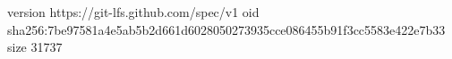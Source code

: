 version https://git-lfs.github.com/spec/v1
oid sha256:7be97581a4e5ab5b2d661d6028050273935cce086455b91f3cc5583e422e7b33
size 31737
